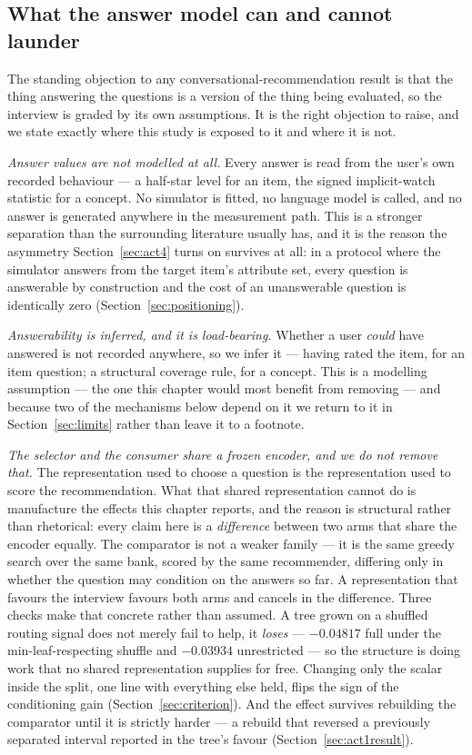 \documentclass[11pt]{article}
\begin{document}
\subsection{What the answer model can and cannot launder}
\label{sec:circularity}

The standing objection to any conversational-recommendation result is that the thing answering the
questions is a version of the thing being evaluated, so the interview is graded by its own
assumptions. It is the right objection to raise, and we state exactly where this study is exposed
to it and where it is not.

\emph{Answer values are not modelled at all.} Every answer is read from the user's own recorded
behaviour --- a half-star level for an item, the signed implicit-watch statistic for a concept. No
simulator is fitted, no language model is called, and no answer is generated anywhere in the
measurement path. This is a stronger separation than the surrounding literature usually has, and it
is the reason the asymmetry Section~\ref{sec:act4} turns on survives at all: in a protocol where the simulator answers
from the target item's attribute set, every question is answerable by construction and the cost of an
unanswerable question is identically zero (Section~\ref{sec:positioning}).

\emph{Answerability is inferred, and it is load-bearing.} Whether a user \emph{could} have answered
is not recorded anywhere, so we infer it --- having rated the item, for an item question; a
structural coverage rule, for a concept. This is a modelling assumption --- the one this chapter
would most benefit from removing --- and because two of the mechanisms below depend on it we return
to it in Section~\ref{sec:limits} rather than leave it to a footnote.

\emph{The selector and the consumer share a frozen encoder, and we do not remove that.} The
representation used to choose a question is the representation used to score the recommendation.
What that shared representation cannot do is manufacture the effects this chapter reports, and the
reason is structural rather than rhetorical: every claim here is a \emph{difference} between two
arms that share the encoder equally. The comparator is not a weaker family --- it is the same greedy
search over the same bank, scored by the same recommender, differing only in whether the question
may condition on the answers so far. A representation that favours the interview favours both
arms and cancels in the difference. Three checks make that concrete rather than assumed. A tree grown
on a shuffled routing signal does not merely fail to help, it \emph{loses} --- $-0.04817$ full under
the min-leaf-respecting shuffle and $-0.03934$ unrestricted --- so the structure is doing work that
no shared representation supplies for free. Changing only the scalar inside the split, one line with
everything else held, flips the sign of the conditioning gain (Section~\ref{sec:criterion}). And the
effect survives rebuilding the comparator until it is strictly harder --- a rebuild that reversed a
previously separated interval reported in the tree's favour (Section~\ref{sec:act1result}).
\end{document}
